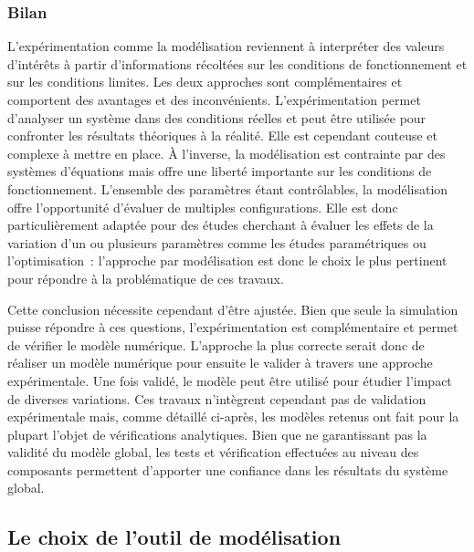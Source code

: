 \subsubsection{Bilan} %
\label{ssub:bilan_modelisation}
L’expérimentation comme la modélisation reviennent à interpréter des valeurs d’intérêts à
partir d’informations récoltées sur les conditions de fonctionnement et sur les conditions
limites. Les deux approches sont complémentaires et comportent des avantages et des
inconvénients. L’expérimentation permet d’analyser un système dans des conditions réelles
et peut être utilisée pour confronter les résultats théoriques à la réalité. Elle est
cependant couteuse et complexe à mettre en place. À l’inverse, la modélisation est
contrainte par des systèmes d’équations mais offre une liberté importante sur les
conditions de fonctionnement. L’ensemble des paramètres étant contrôlables, la
modélisation offre l’opportunité d’évaluer de multiples configurations. Elle est donc
particulièrement adaptée pour des études cherchant à évaluer les effets de la variation
d’un ou plusieurs paramètres comme les études paramétriques ou l’optimisation~:
l’approche par modélisation est donc le choix le plus pertinent pour répondre à la
problématique de ces travaux.

Cette conclusion nécessite cependant d’être ajustée. Bien que seule la simulation puisse
répondre à ces questions, l’expérimentation est complémentaire et permet de vérifier le
modèle numérique. L’approche la plus correcte serait donc de réaliser un modèle numérique
pour ensuite le valider à travers une approche expérimentale. Une fois validé, le modèle
peut être utilisé pour étudier l’impact de diverses variations. Ces travaux n’intègrent
cependant pas de validation expérimentale mais, comme détaillé ci-après, les modèles
retenus ont fait pour la plupart l’objet de vérifications analytiques. Bien que ne
garantissant pas la validité du modèle global, les tests et vérification effectuées au
niveau des composants permettent d’apporter une confiance dans les résultats du système
global.


\subsection{Le choix de l’outil de modélisation} %
\label{sub:le_choix_de_l_outil_de_modelisation}

